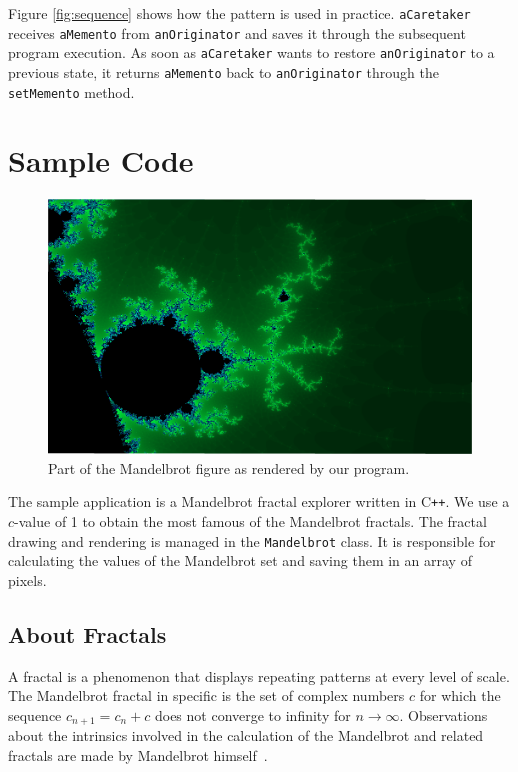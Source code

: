 \documentclass[11pt, a4paper, twoside]{article}
\def\cpp{C{}\texttt{++}}
\begin{document}
	Figure \ref{fig:sequence} shows how the pattern is used in practice. \verb|aCaretaker| receives \verb|aMemento| from \verb|anOriginator| and saves it through the subsequent program execution. As soon as \verb|aCaretaker| wants to restore \verb|anOriginator| to a previous state, it returns \verb|aMemento| back to \verb|anOriginator| through the \verb|setMemento| method.
	
	
	\section{Sample Code}
	
	\begin{figure}[htb]
		\begin{center}
			\includegraphics[width=\textwidth]{mandelbrot.png}
			\caption{Part of the Mandelbrot figure as rendered by our program.}
			\label{fig:mandelbrot}
		\end{center}
	\end{figure}
	
	The sample application is a Mandelbrot  fractal explorer written in \cpp. We use a $c$-value of 1 to obtain the most famous of the Mandelbrot fractals. The fractal drawing and rendering is managed in the \verb|Mandelbrot| class. It is responsible for calculating the values of the Mandelbrot set and saving them in an array of pixels.
	
	\subsection{About Fractals}
	A fractal is a phenomenon that displays repeating patterns at every level of scale. The Mandelbrot fractal in specific is the set of complex numbers $c$ for which the sequence $c_{n+1} = c_n + c$ does not converge to infinity for $n \to \infty$. Observations about the intrinsics involved in the calculation of the Mandelbrot and related fractals are made by Mandelbrot himself~\cite{mandelbrot1980fractal}.
	
\end{document}
